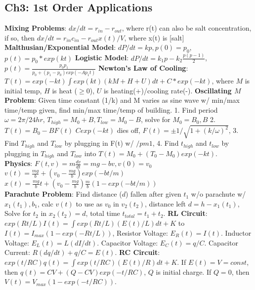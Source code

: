 \subsection*{Ch3: 1st Order Applications}
\textbf{Mixing Problems}: 
$dx/dt = r_{in} - r_{out}$, where r(t) can also be salt concentration, if so, then 
$dx/dt = r_{in}c_{in} - r_{out}x(t)/V$, where x(t) is [salt]
\textbf{Malthusian/Exponential Model}: 
$dP/dt = kp, p(0)=p_0$, $p(t) = p_0*exp(kt)$ 
\textbf{Logistic Model}:
$dP/dt = k_1p-k_2\frac{p(p-1)}{2}$, $p(t) = \frac{p_0p_1}{p_0 + (p_1-p_0)exp(-Ap_1t)}$
\textbf{Newton's Law of Cooling}: 
$T(t) = exp(-kt)\int exp(kt)(kM + H + U)dt + C*exp(-kt)$, where
$M$ is initial temp, $H$ is heat ($\geq 0$), $U$ is heating(+)/cooling rate(-). 
\textbf{Oscillating $M$ Problem}: Given time constant (1/k) and M varies as sine wave w/ min/max time/temp given, find min/max time/temp of building. 
1. Find period $\omega = 2\pi/24hr$, $T_{high} = M_0 + B, T_{low} = M_0 - B$, solve for $M_0 = B_0, B$ 
2. $T(t) = B_0 - BF(t)$  $Cexp(-kt)$ dies off, $F(t) = \pm 1 / \sqrt{1 + (k/\omega)^2}$, 
3. Find $T_{high}$ and $T_{low}$ by plugging in F(t) w/ $ /pm 1$, 
4. Find $t_{high}$ and $t_{low}$ by plugging in $T_{high}$ and $T_{low}$ into $T(t) = M_0 + (T_0 - M_0)exp(-kt)$. \\
\textbf{Physics}: 
$F(t,v) = m\frac{dv}{dt} = mg - bv, v(0) = v_0$ \\
$v(t) = \frac{mg}{b} + (v_0 - \frac{mg}{b})exp(-bt/m)$ \\
$x(t) = \frac{mg}{b}t + (v_0 - \frac{mg}{b})\frac{m}{b}(1-exp(-bt/m))$ \\
\textbf{Parachute Problem}:
Find distance ($d$) fallen after given $t_1$ w/o parachute w/ $x_1(t_1), b_1$, 
calc $v(t)$ to use as $v_0$ in $v_2(t_2)$, distance left $d = h - x_1(t_1)$, 
Solve for $t_2$ in $x_2(t_2) = d$, total time $t_{total} = t_1 + t_2$. 
\textbf{RL Circuit}: 
$exp(Rt/L)I(t) = \int exp(Rt/L)(E(t)/L)dt + K$ to $I(t) = I_{max}(1-exp(-Rt/L))$,
Resistor Voltage: $E_R(t) = I(t)$. 
Inductor Voltage: $E_L(t) = L(dI/dt)$.
Capacitor Voltage: $E_C(t) = q/C$.
Capacitor Current: $R(dq/dt) + q/C = E(t)$.
\textbf{RC Circuit}: 
$exp(t/RC)q(t) = \int exp(t/RC)(E(t)/R)dt + K$. If $E(t) = V = const$, then $q(t) = CV + (Q-CV)exp(-t/RC)$, $Q$ is initial charge. 
If $Q = 0$, then $V(t) = V_{max}(1-exp(-t/RC))$.